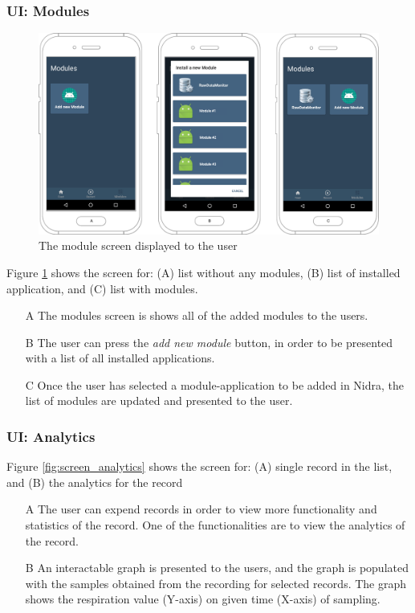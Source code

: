 \subsubsection{UI: Modules}
\begin{figure}
    \centering
    \includegraphics[scale=0.26]{images/Modules_img.pdf}
    \caption{The module screen displayed to the user}
    \label{fig:screen_modules}
\end{figure}

Figure \ref{fig:screen_modules} shows the screen for: (A) list without any modules, (B) list of installed application, and (C) list with modules. 

\begin{itemize}
    \item[A] The modules screen is shows all of the added modules to the users.
    \item[B] The user can press the \textit{add new module} button, in order to be presented with a list of all installed applications. 
    \item[C] Once the user has selected a module-application to be added in Nidra, the list of modules are updated and presented to the user.
\end{itemize}

\subsubsection{UI: Analytics}
Figure \ref{fig:screen_analytics} shows the screen for: (A) single record in the list, and (B) the analytics for the record

\begin{itemize}
    \item[A] The user can expend records in order to view more functionality and statistics of the record. One of the functionalities are to view the analytics of the record.
    \item[B] An interactable graph is presented to the users, and the graph is populated with the samples obtained from the recording for selected records. The graph shows the respiration value (Y-axis) on given time (X-axis) of sampling. 
\end{itemize}

